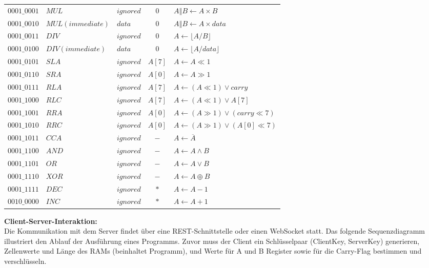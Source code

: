 \begin{table}[htbp]
\begin{tabularx}{\textwidth}{l l l c X}
\midrule
$0001\_0001$ & $MUL$              & $ignored$  & $0$     & $A \mathbin{\Vert} B \leftarrow A \times B$ \\
$0001\_0010$ & $MUL (immediate)$  & $data$       & $0$     & $A \mathbin{\Vert} B \leftarrow A \times data$ \\
$0001\_0011$ & $DIV$              & $ignored$  & $0$     & $A \leftarrow \lfloor A / B \rfloor$ \\
$0001\_0100$ & $DIV (immediate)$  & $data$       & $0$     & $A \leftarrow \lfloor A / data \rfloor$ \\
\midrule
$0001\_0101$ & $SLA$              & $ignored$  & $A[7]$  & $A \leftarrow A \ll 1$ \\
$0001\_0110$ & $SRA$              & $ignored$  & $A[0]$  & $A \leftarrow A \gg 1$ \\
$0001\_0111$ & $RLA$              & $ignored$  & $A[7]$  & $A \leftarrow (A \ll 1) \lor carry$ \\
$0001\_1000$ & $RLC$              & $ignored$  & $A[7]$  & $A \leftarrow (A \ll 1) \lor A[7]$ \\
$0001\_1001$ & $RRA$              & $ignored$  & $A[0]$  & $A \leftarrow (A \gg 1) \lor (carry \ll 7)$ \\
$0001\_1010$ & $RRC$              & $ignored$  & $A[0]$  & $A \leftarrow (A \gg 1) \lor (A[0] \ll 7)$ \\
\midrule
$0001\_1011$ & $CCA$              & $ignored$  & $-$     & $A \leftarrow \overline{A}$ \\
$0001\_1100$ & $AND$              & $ignored$  & $-$     & $A \leftarrow A \land B$ \\
$0001\_1101$ & $OR$               & $ignored$  & $-$     & $A \leftarrow A  \lor B$ \\
$0001\_1110$ & $XOR$              & $ignored$  & $-$     & $A \leftarrow A \oplus B$ \\
\midrule
$0001\_1111$ & $DEC$              & $ignored$  & $*$   & $A \leftarrow A - 1$ \\
$0010\_0000$ & $INC$              & $ignored$  & $*$   & $A \leftarrow A + 1$ \\
\bottomrule
    \end{tabularx}
\end{table}


\textbf{Client-Server-Interaktion:}\\
Die Kommunikation mit dem Server findet über eine REST-Schnittstelle oder einen WebSocket statt.
Das folgende Sequenzdiagramm illustriert den Ablauf der Ausführung eines Programms.
Zuvor muss der Client ein Schlüsselpaar (ClientKey, ServerKey) generieren, Zellenwerte und Länge des RAMs (beinhaltet Programm),
und Werte für A und B Register sowie für die Carry-Flag bestimmen und verschlüsseln.

